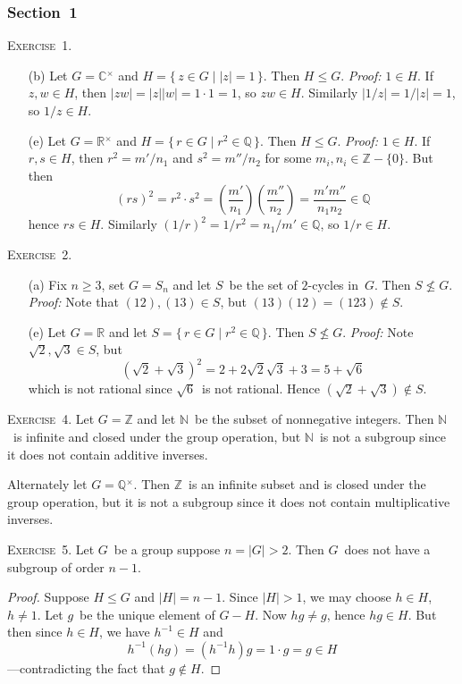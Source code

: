 \documentclass[letterpaper]{article}
\newcommand{\exercise}[1]{\goodbreak\noindent\textsc{Exercise~{#1}.}}
\newcommand{\Z}{\mathbb{Z}}
\newcommand{\N}{\mathbb{N}}
\newcommand{\Q}{\mathbb{Q}}
\newcommand{\R}{\mathbb{R}}
\newcommand{\C}{\mathbb{C}}
\newcommand{\subgroup}{\le}
\newcommand{\mi}[1]{{#1}{}^{\times}}
\newcommand{\ord}[1]{|{#1}|}
\newcommand{\abs}[1]{|{#1}|}
\begin{document}
\subsubsection*{Section~1}
\exercise{1}
\begin{enumerate}
\item[(b)] Let $G=\mi{\C}$ and $H=\{\,z\in G\mid\abs{z}=1\,\}$. Then $H\subgroup G$. \emph{Proof:} $1\in H$. If $z,w\in H$, then $\abs{zw}=\abs{z}\abs{w}=1\cdot1=1$, so $zw\in H$. Similarly $\abs{1/z}=1/\abs{z}=1$, so $1/z\in H$.
\item[(e)] Let $G=\mi{\R}$ and $H=\{\,r\in G\mid r^2\in\Q\,\}$. Then $H\subgroup G$. \emph{Proof:} $1\in H$. If $r,s\in H$, then $r^2=m'/n_1$ and $s^2=m''/n_2$ for some $m_i,n_i\in\Z-\{0\}$. But then
$$(rs)^2=r^2\cdot s^2=\left(\frac{m'}{n_1}\right)\left(\frac{m''}{n_2}\right)=\frac{m'm''}{n_1n_2}\in\Q$$
hence $rs\in H$. Similarly $(1/r)^2=1/r^2=n_1/m'\in\Q$, so $1/r\in H$.
\end{enumerate}

\exercise{2}
\begin{enumerate}
\item[(a)] Fix $n\ge 3$, set $G=S_n$ and let $S$~be the set of $2$-cycles in~$G$. Then $S\not\subgroup G$. \emph{Proof:} Note that $(12),(13)\in S$, but $(13)(12)=(123)\not\in S$.
\item[(e)] Let $G=\R$ and let $S=\{\,r\in G\mid r^2\in\Q\,\}$. Then $S\not\subgroup G$. \emph{Proof:} Note $\sqrt{2},\sqrt{3}\in S$, but
$$(\sqrt{2}+\sqrt{3})^2=2+2\sqrt{2}\sqrt{3}+3=5+\sqrt{6}$$
which is not rational since $\sqrt{6}$~is not rational. Hence $(\sqrt{2}+\sqrt{3})\not\in S$.
\end{enumerate}

\exercise{4}
Let $G=\Z$ and let $\N$~be the subset of nonnegative integers. Then $\N$~is infinite and closed under the group operation, but $\N$~is not a subgroup since it does not contain additive inverses.

Alternately let $G=\mi{\Q}$. Then $\Z$~is an infinite subset and is closed under the group operation, but it is not a subgroup since it does not contain multiplicative inverses.

\bigskip
\exercise{5}
Let $G$~be a group suppose $n=\ord{G}>2$. Then $G$~does not have a subgroup of order $n-1$.
\begin{proof}
Suppose $H\subgroup G$ and $\ord{H}=n-1$. Since $\ord{H}>1$, we may choose $h\in H$, $h\ne 1$. Let $g$~be the unique element of $G-H$. Now $hg\ne g$, hence $hg\in H$. But then since $h\in H$, we have $h^{-1}\in H$ and
$$h^{-1}(hg)=(h^{-1}h)g=1\cdot g=g\in H$$
---contradicting the fact that $g\not\in H$.
\end{proof}
\end{document}
